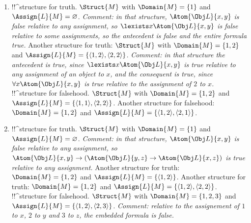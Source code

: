 \documentclass[../../../../include/open-logic-section]{subfiles}
\begin{document}
\begin{prob}
\begin{ans}
\begin{enumerate}
	\item !!^{structure} for truth. $\Struct{M}$
	with $\Domain{M}=\{1\}$ and $\Assign{L}{M}=\varnothing$. \emph{Comment: in that structure, $\Atom{\Obj L}{x,y}$ is false relative to any assignment, so $\lexists x \Atom{\Obj L}{x,y}$ is false relative to some assignments, so the antecedent is false and the entire formula true.} Another structure for truth: $\Struct{M}$
	with $\Domain{M}=\{1,2\}$ and $\Assign{L}{M}=\{\langle 1,2 \rangle, 
	\langle 2,2 \rangle \}$. \emph{Comment: in that structure the antecedent 
	is true, since $\lexists x \Atom{\Obj L}{x,y}$ is true relative to any assignment of an object to $x$, and the consequent is true, since $\forall x \Atom{\Obj L}{x,y}$ is true relative to the assignment of $2$ to $x$.}\\
	!!^{structure} for falsehood. $\Struct{M}$ with
	$\Domain{M}=\{1,2\}$ and $\Assign{L}{M}=\{\langle 1,1 \rangle,
	\langle 2,2 \rangle\}$. Another structure for falsehood:
	$\Domain{M}=\{1,2\}$ and $\Assign{L}{M}=\{\langle 1,2 \rangle,
	\langle 2,1 \rangle\}$.

	\item !!^{structure} for truth. $\Struct{M}$ with
	$\Domain{M}=\{1\}$ and $\Assign{L}{M}=\varnothing$. \emph{Comment:
	in that structure, $\Atom{\Obj L}{x,y}$ is false relative to any
	assignment, so $\Atom{\Obj L}{x,y} \rightarrow (\Atom{\Obj L}{y,z}
	\rightarrow \Atom{\Obj L}{x,z})$ is true relative to any
	assignment.} Another structure for truth: $\Domain{M}=\{1,2\}$ and
	$\Assign{L}{M}=\{\langle 1,2 \rangle \}$. Another structure for
	truth: $\Domain{M}=\{1,2\}$ and $\Assign{L}{M}=\{\langle 1,2
	\rangle, \langle 2,2 \rangle \}$.\\
	!!^{structure} for falsehood. $\Struct{M}$ with
	$\Domain{M}=\{1,2,3\}$ and $\Assign{L}{M}=\{\langle 1,2 \rangle,
	\langle 2,3 \rangle \}$. \emph{Comment: relative to the
	assignement of $1$ to $x$, $2$ to $y$ and $3$ to $z$, the embedded
	formula is false.}
\end{enumerate}
\end{ans}
\end{prob}
\end{document}

